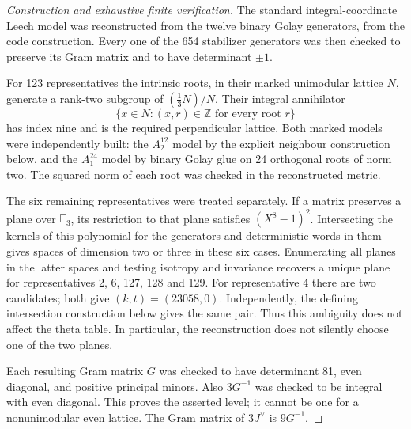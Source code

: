\begin{proof}[Construction and exhaustive finite verification]
The standard integral-coordinate Leech model was reconstructed from
the twelve binary Golay generators, from the code construction. Every one of the 654 stabilizer generators was
then checked to preserve its Gram matrix and to have determinant
$\pm1$.

For 123 representatives the intrinsic roots, in their marked
unimodular lattice $N$, generate a rank-two subgroup of
$(\tfrac13N)/N$. Their integral annihilator
\[
 \{x\in N:(x,r)\in\mathbb Z\text{ for every root }r\}
\]
has index nine and is the required perpendicular lattice. Both marked
models were independently built: the $A_2^{12}$ model by the explicit
neighbour construction below, and the $A_1^{24}$ model by binary Golay
glue on 24 orthogonal roots of norm two. The squared norm of each
root was checked in the reconstructed metric.

The six remaining representatives were treated separately. If a matrix
preserves a plane over $\mathbb F_3$, its restriction to that plane
satisfies $(X^8-1)^2$. Intersecting the kernels of this polynomial
for the generators and deterministic words in them gives
spaces of dimension two or three in these six cases. Enumerating all
planes in the latter spaces and testing isotropy and invariance
recovers a unique plane for representatives 2, 6, 127, 128 and 129. For representative
4 there are two candidates; both give $(k,t)=(23058,0)$. Independently,
the defining intersection construction below gives the same pair.
Thus this ambiguity does not affect the theta table. In particular,
the reconstruction does not silently choose one of the two planes.

Each resulting Gram matrix $G$ was checked to have determinant 81,
even diagonal, and positive principal minors. Also $3G^{-1}$ was
checked to be integral with even diagonal. This proves the asserted
level; it cannot be one for a nonunimodular even lattice. The Gram
matrix of $3J^\vee$ is $9G^{-1}$.


\end{proof}
